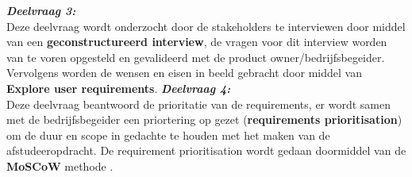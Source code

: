 \whitespace
\textit{\textbf{Deelvraag 3:} \SubquestionThree} \\
Deze deelvraag wordt onderzocht door de stakeholders te interviewen door middel van een \textbf{geconstructureerd interview}, de vragen voor dit interview worden van te voren opgesteld en gevalideerd met de product owner/bedrijfsbegeider.
Vervolgens worden de wensen en eisen in beeld gebracht door middel van \textbf{Explore user requirements}.
\whitespace
\textit{\textbf{Deelvraag 4:} \SubquestionFour} \\
Deze deelvraag beantwoord de prioritatie van de requirements,
er wordt samen met de bedrijfsbegeider een priortering op gezet (\textbf{requirements prioritisation}) om de duur en scope in gedachte te houden met het maken van de afstudeeropdracht.
De requirement prioritisation wordt gedaan doormiddel van de \textbf{MoSCoW} methode .
